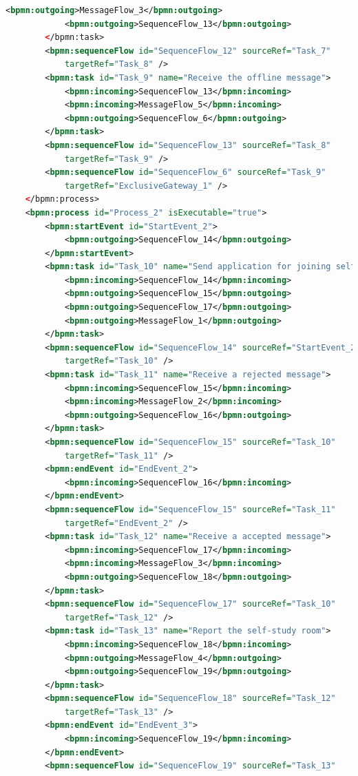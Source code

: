 \documentclass[runningheads]{llncs}
\begin{document}
\begin{lstlisting}[language={XML}]
	        <bpmn:outgoing>MessageFlow_3</bpmn:outgoing>
			<bpmn:outgoing>SequenceFlow_13</bpmn:outgoing>
	    </bpmn:task>
		<bpmn:sequenceFlow id="SequenceFlow_12" sourceRef="Task_7"
	        targetRef="Task_8" />
		<bpmn:task id="Task_9" name="Receive the offline message">
	        <bpmn:incoming>SequenceFlow_13</bpmn:incoming>
	        <bpmn:incoming>MessageFlow_5</bpmn:incoming>
			<bpmn:outgoing>SequenceFlow_6</bpmn:outgoing>
	    </bpmn:task>
		<bpmn:sequenceFlow id="SequenceFlow_13" sourceRef="Task_8"
	        targetRef="Task_9" />
		<bpmn:sequenceFlow id="SequenceFlow_6" sourceRef="Task_9"
	        targetRef="ExclusiveGateway_1" />
	</bpmn:process>
	<bpmn:process id="Process_2" isExecutable="true">
		<bpmn:startEvent id="StartEvent_2">
	        <bpmn:outgoing>SequenceFlow_14</bpmn:outgoing>
	    </bpmn:startEvent>
		<bpmn:task id="Task_10" name="Send application for joining self-study room">
	        <bpmn:incoming>SequenceFlow_14</bpmn:incoming>
	        <bpmn:outgoing>SequenceFlow_15</bpmn:outgoing>
			<bpmn:outgoing>SequenceFlow_17</bpmn:outgoing>
			<bpmn:outgoing>MessageFlow_1</bpmn:outgoing>
	    </bpmn:task>
		<bpmn:sequenceFlow id="SequenceFlow_14" sourceRef="StartEvent_2"
	        targetRef="Task_10" />
		<bpmn:task id="Task_11" name="Receive a rejected message">
	        <bpmn:incoming>SequenceFlow_15</bpmn:incoming>
			<bpmn:incoming>MessageFlow_2</bpmn:incoming>
	        <bpmn:outgoing>SequenceFlow_16</bpmn:outgoing>
	    </bpmn:task>
		<bpmn:sequenceFlow id="SequenceFlow_15" sourceRef="Task_10"
	        targetRef="Task_11" />
		<bpmn:endEvent id="EndEvent_2">
			<bpmn:incoming>SequenceFlow_16</bpmn:incoming>
		</bpmn:endEvent>
		<bpmn:sequenceFlow id="SequenceFlow_15" sourceRef="Task_11"
	        targetRef="EndEvent_2" />
		<bpmn:task id="Task_12" name="Receive a accepted message">
	        <bpmn:incoming>SequenceFlow_17</bpmn:incoming>
			<bpmn:incoming>MessageFlow_3</bpmn:incoming>
	        <bpmn:outgoing>SequenceFlow_18</bpmn:outgoing>
	    </bpmn:task>
		<bpmn:sequenceFlow id="SequenceFlow_17" sourceRef="Task_10"
	        targetRef="Task_12" />
		<bpmn:task id="Task_13" name="Report the self-study room">
	        <bpmn:incoming>SequenceFlow_18</bpmn:incoming>
			<bpmn:outgoing>MessageFlow_4</bpmn:outgoing>
	        <bpmn:outgoing>SequenceFlow_19</bpmn:outgoing>
	    </bpmn:task>
		<bpmn:sequenceFlow id="SequenceFlow_18" sourceRef="Task_12"
	        targetRef="Task_13" />
		<bpmn:endEvent id="EndEvent_3">
			<bpmn:incoming>SequenceFlow_19</bpmn:incoming>
		</bpmn:endEvent>
		<bpmn:sequenceFlow id="SequenceFlow_19" sourceRef="Task_13"

\end{lstlisting}
\end{document}

